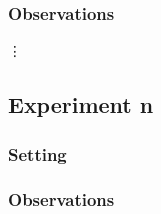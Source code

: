 \documentclass[11pt]{article}
\begin{document}
\subsubsection{Observations}

\vdots

\subsection{Experiment n}

\subsubsection{Setting}

\subsubsection{Observations}
\end{document}

